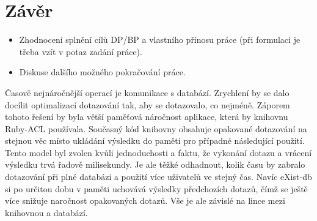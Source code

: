 \chapter{Závěr}

\begin{itemize}
\item Zhodnocení splnění cílů DP/BP a  vlastního přínosu práce (při formulaci je třeba vzít v potaz zadání práce).
\item Diskuse dalšího možného pokračování práce.
\end{itemize} 

Časově nejnáročnější operací je komunikace s databází. Zrychlení by se dalo docílit optimalizací dotazování tak, aby se dotazovalo, co nejméně. Záporem tohoto řešení by byla větší paměťová náročnost aplikace, která by knihovnu Ruby-ACL používala. Současný kód knihovny obsahuje opakované dotazování na stejnou věc místo ukládání výsledku do paměti pro případné následující použití. Tento model byl zvolen kvůli jednoduchosti a faktu, že vykonání dotazu a vrácení výsledku trvá řadově milisekundy. Je ale těžké odhadnout, kolik času by zabralo dotazování při plné databázi a použití více uživatelů ve stejný čas. Navíc eXist-db si po určitou dobu v paměti uchovává výsledky předchozích dotazů, čímž se ještě více snižuje naročnost opakovaných dotazů. Vše je ale závislé na lince mezi knihovnou a databází.